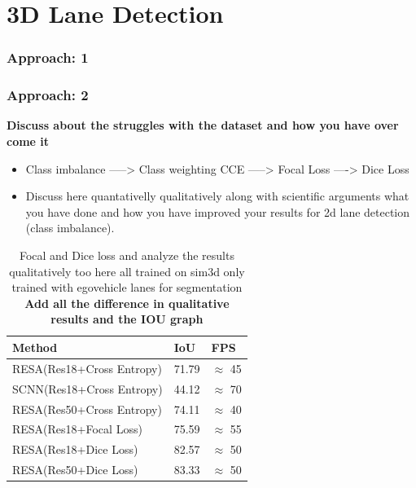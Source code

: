     \section{3D Lane Detection}
    
    \subsubsection{Approach: 1}
    \subsubsection{Approach: 2}
    
    
    

    \textbf{Discuss about the struggles with the dataset and how you have over come it} 
        
    \begin{itemize}
        \item Class imbalance ----->  Class weighting CCE -----> Focal Loss ----> Dice Loss
    \end{itemize}
      


\begin{itemize}
     \item Discuss here quantativelly qualitatively along with scientific arguments what you have done and how you have improved your results for 2d lane detection (class imbalance).
\end{itemize}
     \begin{table}[h]
    \caption{Focal and Dice loss and analyze the results qualitatively too here all trained on sim3d only trained with egovehicle lanes for segmentation \textbf{Add all the difference in qualitative results and the IOU graph}}
    \centering
    \begin{tabular}{|l|l|l|}
    \hline
        \textbf{Method} & \textbf{IoU} & \textbf{FPS} \\ \hline
        RESA(Res18+Cross Entropy) & 71.79 & $\approx$ 45 \\ \hline
        SCNN(Res18+Cross Entropy) & 44.12 & $\approx$ 70  \\ \hline
        RESA(Res50+Cross Entropy) & 74.11 & $\approx$ 40  \\ \hline
        RESA(Res18+Focal Loss) & 75.59 & $\approx$ 55 \\\hline
        RESA(Res18+Dice Loss) & 82.57 & $\approx$ 50 \\\hline
        RESA(Res50+Dice Loss) & 83.33 & $\approx$ 50 \\\hline
    \end{tabular}
\end{table}
    
